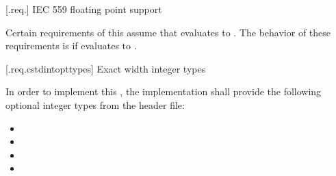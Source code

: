  [\iotwod.req.\iecfivefivenine] {IEC 559 floating point support}

\pnum
Certain requirements of this \documenttypename{} assume that  evaluates to . The behavior of these requirements is  if  evaluates to .

 [\iotwod.req.cstdintopttypes] {Exact width integer types}

\pnum
In order to implement this \documenttypename{}, the implementation shall provide the following optional integer types from the  header file:
\begin{itemize}
	\item {}
	\item {}
	\item {}
	\item {}
\end{itemize}
